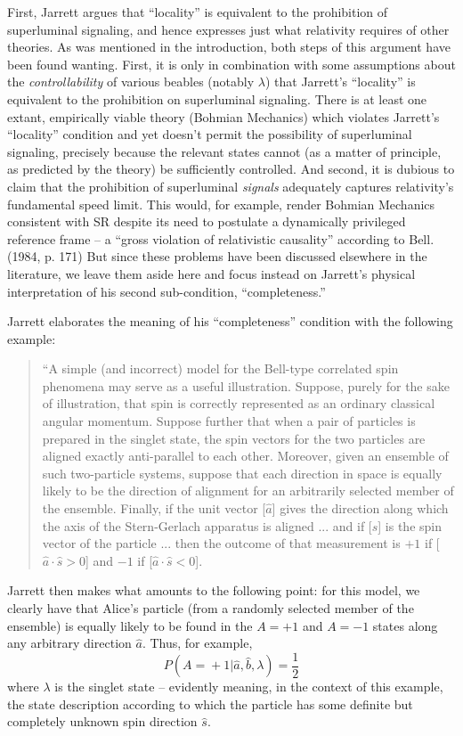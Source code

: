 \documentclass[12pt]{article}
\begin{document}
First, Jarrett argues that ``locality'' is equivalent to the
prohibition of superluminal signaling, and 
hence expresses just what relativity requires of other theories.  As
was mentioned in the introduction, both steps of this argument have
been found wanting.  First, it is only in combination with some assumptions
about the \emph{controllability} of various beables (notably
$\lambda$) that Jarrett's ``locality'' is equivalent to the
prohibition on superluminal signaling.  There is at least one
extant, empirically viable theory (Bohmian Mechanics) which violates
Jarrett's ``locality'' condition and yet doesn't permit the
possibility of superluminal signaling, precisely because the relevant
states cannot (as a matter of principle, as predicted by the
theory) be sufficiently controlled.  And second, it is dubious to
claim that the prohibition of superluminal \emph{signals} adequately
captures relativity's fundamental speed limit.  This would, for
example, render Bohmian Mechanics consistent with SR despite its need
to postulate a dynamically privileged reference frame -- a ``gross
violation of relativistic causality'' according to Bell. (1984, p. 171)
But since these
problems have been discussed elsewhere in the literature, we leave
them aside here and focus instead on Jarrett's physical interpretation
of his second sub-condition, ``completeness.''  

Jarrett elaborates the meaning of his ``completeness'' condition with
the following example:
\begin{quote}
``A simple (and incorrect) model for the Bell-type correlated spin
phenomena may serve as a useful illustration.  Suppose, purely for the
sake of illustration, that spin is correctly represented as an
ordinary classical angular momentum.  Suppose further that when a pair
of particles is prepared in the singlet state, the spin vectors for
the two particles are aligned exactly anti-parallel to each other.
Moreover, given an ensemble of such two-particle systems, suppose that
each direction in space is equally likely to be the direction of
alignment for an arbitrarily selected member of the ensemble.
Finally, if the unit vector [$\hat{a}$] gives the direction along
which the
axis of the Stern-Gerlach apparatus is aligned ... and if [$\hat{s}$]
is the spin vector of the particle ... then the outcome of that
measurement is $+1$ if [$\hat{a}\cdot \hat{s} > 0$] and $-1$ if
[$\hat{a}\cdot \hat{s} < 0$].  
\end{quote}
Jarrett then makes what amounts to the following point:  for this
model, we clearly have that Alice's particle (from a randomly selected
member of the ensemble) is equally likely
to be found in the $A = +1$ and $A = -1$ states along any arbitrary
direction $\hat{a}$.  Thus, for example,
\begin{equation}
P (A \! = \! +1 | \hat{a}, \hat{b}, \lambda) = \frac{1}{2}
\label{eq:comp1}
\end{equation}
where $\lambda$ is the singlet state -- evidently meaning, in the context of
this example, the state description according to which the particle has
some definite but completely unknown spin direction $\hat{s}$.  
\end{document}
